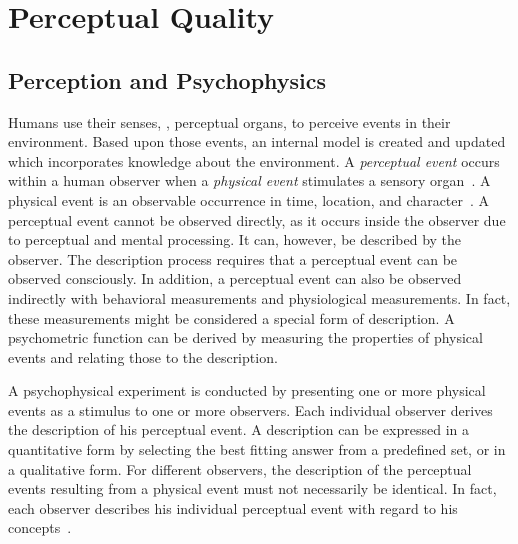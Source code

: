 \section{Perceptual Quality}
\subsection{Perception and Psychophysics}
Humans use their senses, \ie, perceptual organs, to perceive events in their environment.
Based upon those events, an internal model is created and updated which incorporates knowledge about the environment.
A \emph{perceptual event} occurs within a human observer when a \emph{physical event} stimulates a sensory organ~\citep[p.\,5]{blauert_spatial_1996}.
A physical event is an observable occurrence in time, location, and character~\citep{le_callet_qualinet_2013}.
A perceptual event cannot be observed directly, as it occurs inside the observer due to perceptual and mental processing.
It can, however, be described by the observer.
The description process requires that a perceptual event can be observed consciously.
In addition, a perceptual event can also be observed indirectly with behavioral measurements and physiological measurements.
In fact, these measurements might be considered a special form of description.
A psychometric function can be derived by measuring the properties of physical events and relating those to the description.

A psychophysical experiment is conducted by presenting one or more physical events as a stimulus to one or more observers.
Each individual observer derives the description of his perceptual event.
A description can be expressed in a quantitative form by selecting the best fitting answer from a predefined set, or in a qualitative form.
For different observers, the description of the perceptual events resulting from a physical event must not necessarily be identical.
In fact, each observer describes his individual perceptual event with regard to his concepts~\citep[p.\,11]{blauert_spatial_1996}.

